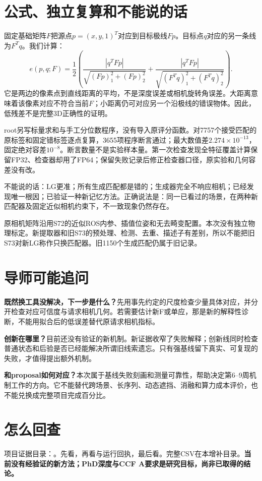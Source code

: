 \documentclass[UTF8,11pt,a4paper]{ctexart}
\begin{document}
\section{公式、独立复算和不能说的话}
固定基础矩阵$F$把源点$p=(x,y,1)^T$对应到目标极线$Fp$。目标点$q$对应的另一条线为$F^Tq$。我们计算：
\[
e(p,q;F)=\frac12\left(\frac{|q^TFp|}{\sqrt{(Fp)_1^2+(Fp)_2^2}}+\frac{|q^TFp|}{\sqrt{(F^Tq)_1^2+(F^Tq)_2^2}}\right).
\]
它是两边的像素点到直线距离的平均，不是深度误差或相机旋转角误差。大距离意味着该像素对应不符合当前$F$；小距离仍可对应另一个沿极线的错误物体。因此，低残差不是完整3D正确性的证明。

root另写标量求和与手工分位数程序，没有导入原评分函数。对7757个接受匹配的原标签和固定错标签逐点复算，3655项程序断言通过；最大数值差$2.274\times10^{-13}$，固定绝对容差$10^{-8}$。断言数量不是实验样本量。第一次检查发现全特征覆盖计算保留FP32、检查器却用了FP64；保留失败记录后修正检查器口径，原实验和几何容差没有改。

不能说的话：LG更准；所有生成匹配都是错的；生成器完全不响应相机；已经发现唯一根因；已验证一种新记忆方法。正确说法是：同一已看过的场景，在两种新匹配器及固定近似相机约束下，不一致现象仍然存在。

原相机矩阵沿用S72的近似ROS内参、插值位姿和无去畸变配置。本次没有独立物理标定。新提取器和旧S73的预处理、检测、去重、描述子有差别，所以不能把旧S73对新LG称作只换匹配器。旧1150个生成匹配仍属于旧记录。

\section{导师可能追问}
\textbf{既然换工具没解决，下一步是什么？}先用事先约定的尺度检查少量具体对应，并分开检查对应可信度与请求相机几何。若需要估计新F或单应，那是新的解释性诊断，不能用拟合后的低误差替代原请求相机指标。

\textbf{创新在哪里？}目前还没有验证的新机制。新证据收窄了失败解释；创新线同时检查普通状态和后验是否已经能解决所谓旧线索遗忘。只有强基线留下真实、可复现的失败，才值得提出额外机制。

\textbf{和proposal如何对应？}本次属于基线失败刻画和测量可靠性，帮助决定第6--9周机制工作的方向。它不能替代跨场景、长序列、动态遮挡、消融和算力成本评价，也不能兑换成完整项目完成百分比。

\section{怎么回查}
项目证据目录：。先看，再看与运行回执，最后看。完整CSV在本增补目录。\textbf{当前没有经验证的新方法；PhD深度与CCF A要求是研究目标，尚非已取得的结论。}
\end{document}
